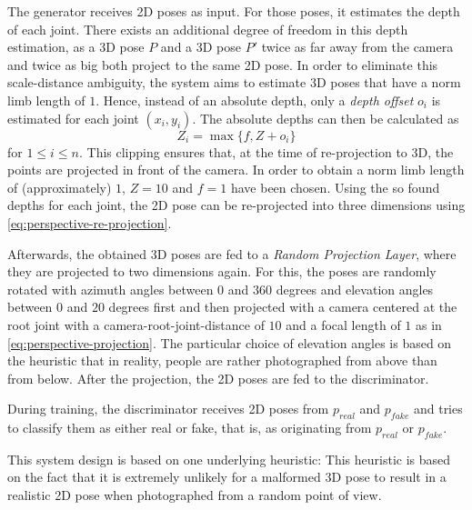 The generator receives 2D poses as input.
For those poses, it estimates the depth of each joint.
There exists an additional degree of freedom in this depth estimation, as a 3D pose $P$ and a 3D pose $P'$ twice as far away from the camera and twice as big both project to the same 2D pose.
In order to eliminate this scale-distance ambiguity, the system aims to estimate 3D poses that have a norm limb length of $1$.
Hence, instead of an absolute depth, only a \emph{depth offset} $o_i$ is estimated for each joint $(x_i, y_i)$.
The absolute depths can then be calculated as
\begin{equation}
	\label{eq:depth-clipping}
	Z_i = \max \{f, Z + o_i\}
\end{equation}
for $1 \leq i \leq n$.
This clipping ensures that, at the time of re-projection to 3D, the points are projected in front of the camera.
In order to obtain a norm limb length of (approximately) $1$, $Z = 10$ and $f = 1$ have been chosen.
Using the so found depths for each joint, the 2D pose can be re-projected into three dimensions using \autoref{eq:perspective-re-projection}.

Afterwards, the obtained 3D poses are fed to a \emph{Random Projection Layer}, where they are projected to two dimensions again.
For this, the poses are randomly rotated with azimuth angles between $0$ and $360$ degrees and elevation angles between $0$ and $20$ degrees first and then projected with a camera centered at the root joint with a camera-root-joint-distance of $10$ and a focal length of $1$ as in \autoref{eq:perspective-projection}.
The particular choice of elevation angles is based on the heuristic that in reality, people are rather photographed from above than from below.
After the projection, the 2D poses are fed to the discriminator.

During training, the discriminator receives 2D poses from $p_{real}$ and $p_{fake}$ and tries to classify them as either real or fake, that is, as originating from $p_{real}$ or $p_{fake}$.

This system design is based on one underlying heuristic:\vspace{.5em}\newline
\vspace{.5em}
\newline
This heuristic is based on the fact that it is extremely unlikely for a malformed 3D pose to result in a realistic 2D pose when photographed from a random point of view.

